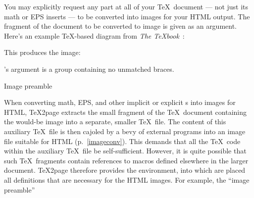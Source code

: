 {{{{{{{{{{{{{{
%
%
You may explicitly request any part at all of your \TeX\
document --- not just its math or EPS inserts ---
to be converted into images for your HTML output.  The
fragment of the document to be converted to image is
given as an \p{\makehtmlimage} argument.
Here's an example \TeX-based diagram from {\em
The \TeX book}~\cite[p~389]{tex}:



\n This produces the  image:

\smallskip

\smallskip

\n \p{\makehtmlimage}'s argument is a group containing
no unmatched braces.

\beginsection Image preamble

%
When converting math, EPS, and other implicit or
explicit \p{\htmlimage}s into images for HTML, \TeX2page
extracts the small fragment of the \TeX\ document
containing the would-be image into a separate, smaller
\TeX\ file.  The content of this auxiliary \TeX\ file is
then cajoled by a bevy of external programs into
an image file suitable for HTML (p.~\ref{imageconv}).  This demands that
all the \TeX\ code within the auxiliary \TeX\ file be
self-sufficient.  However, it is quite possible that
such \TeX\ fragments contain references to macros
defined elsewhere in the larger document.
\TeX2page therefore provides the \p{\imgpreamble}
 \p{\endimgpreamble} environment, into which
are placed all definitions that are necessary for
the HTML images.   For example, the ``image preamble''

}}}}}}}}}}}}}}
